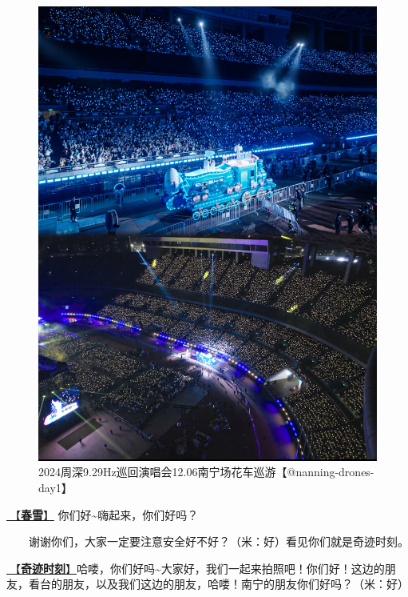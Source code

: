 \documentclass[]{ctexbook}
\begin{document}
\begin{figure}

{\centering \includegraphics[width=350pt]{img/nanning20241206/003} 

}

\caption{2024周深9.29Hz巡回演唱会12.06南宁场花车巡游【@nanning-drones-day1】}\label{fig:unnamed-chunk-154}
\end{figure}

\hyperref[spring-snow]{🎵【\textbf{春雪}】} 你们好\textasciitilde 嗨起来，你们好吗？

  谢谢你们，大家一定要注意安全好不好？（米：好）看见你们就是奇迹时刻。

\hyperref[magic-moment]{🎵【\textbf{奇迹时刻}】}哈喽，你们好吗\textasciitilde 大家好，我们一起来拍照吧！你们好！这边的朋友，看台的朋友，以及我们这边的朋友，哈喽！南宁的朋友你们好吗？（米：好）
\end{document}
